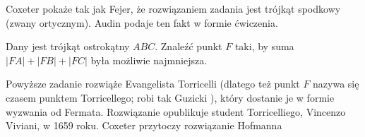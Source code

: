 Coxeter \cite[s. 36, 37]{coxeter_1967} pokaże tak jak Fejer, że rozwiązaniem zadania jest trójkąt spodkowy (zwany ortycznym).
Audin \cite[s. 101]{audin_2003} podaje ten fakt w formie ćwiczenia. %

\begin{problem}
	\label{punkt_fermata}
	Dany jest trójkąt ostrokątny $ABC$.
	Znaleźć punkt $F$ taki, by suma $|FA| + |FB| + |FC|$ była możliwie najmniejsza.
%
\end{problem}


Powyższe zadanie rozwiąże Evangelista Torricelli (dlatego też punkt $F$ nazywa się czasem punktem Torricellego; robi tak Guzicki \cite[s. 224-228]{guzicki_2021}), który dostanie je w formie wyzwania od Fermata.
Rozwiązanie opublikuje student Torricelliego, Vincenzo Viviani, w 1659 roku.
Coxeter \cite[s. 37]{coxeter_1967} przytoczy rozwiązanie Hofmanna

%